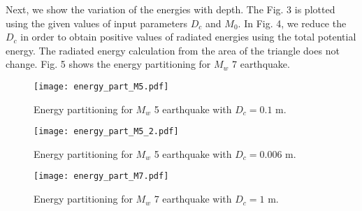 \documentclass[11pt]{article}
\begin{document}
Next, we show the variation of the energies with depth. The Fig. 3 is plotted using the given values of input parameters $D_c$ and $M_0$. In Fig. 4, we reduce the $D_c$ in order to obtain positive values of radiated energies using the total potential energy. The radiated energy calculation from the area of the triangle does not change. Fig. 5 shows the energy partitioning for $M_w$ 7 earthquake.
\begin{figure}[!htb]
    \centering
    \texttt{[image: energy\_part\_M5.pdf]}\\
    \caption{Energy partitioning for $M_w$ 5 earthquake with $D_c = 0.1$ m.}
\end{figure}
\begin{figure}[!htb]
    \centering
    \texttt{[image: energy\_part\_M5\_2.pdf]}\\
    \caption{Energy partitioning for $M_w$ 5 earthquake with $D_c = 0.006$ m.}
\end{figure}
\begin{figure}[!htb]
    \centering
    \texttt{[image: energy\_part\_M7.pdf]}\\
    \caption{Energy partitioning for $M_w$ 7 earthquake with $D_c = 1$ m.}
\end{figure}
\clearpage
\end{document}
